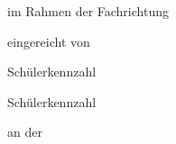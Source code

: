 \begin{center}
%
\begin{minipage}[t][5.2cm][b]{\linewidth}%
    \centering%
    \thesistitlefontLARGE\sffamily\bfseries\tuinfthesistitle%
\end{minipage}


\vspace{1.3cm}

{\thesistitlefontLARGE\sffamily \tuinfthesistype}

\vspace{6mm}




\vspace{6mm}

{\thesistitlefontlarge\sffamily im Rahmen der Fachrichtung}

\vspace{6mm}

{\thesistitlefontLarge\sffamily\bfseries \tuinfthesiscurriculum}

\vspace{6.5mm}

{\thesistitlefontlarge\sffamily eingereicht von}

\vspace{6mm}

{\thesistitlefontLarge\sffamily\bfseries \tuinfthesisauthoreins}

\vspace{1.5mm}

{\thesistitlefontlarge\sffamily Schülerkennzahl \tuinfthesismatrikelnoeins} 

\vspace{6mm}

{\thesistitlefontLarge\sffamily\bfseries \tuinfthesisauthorzwei}

\vspace{1.5mm}

{\thesistitlefontlarge\sffamily Schülerkennzahl \tuinfthesismatrikelnozwei} 

\vspace{1.5cm}

\begin{minipage}[t][1.7cm][t]{\textwidth}%
  \vspace{0pt}\raggedright\thesistitlefontnormalsize\sffamily
  an der


\end{minipage}
\end{center}

